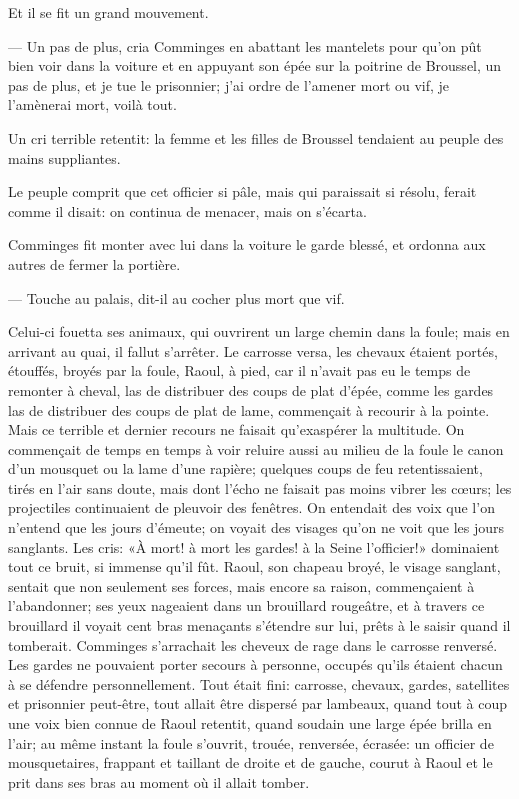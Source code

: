 Et il se fit un grand mouvement.

— Un pas de plus, cria Comminges en abattant les mantelets pour qu'on pût bien voir dans la voiture et en appuyant son épée sur la poitrine de Broussel, un pas de plus, et je tue le prisonnier; j'ai ordre de l'amener mort ou vif, je l'amènerai mort, voilà tout.

Un cri terrible retentit: la femme et les filles de Broussel tendaient au peuple des mains suppliantes.

Le peuple comprit que cet officier si pâle, mais qui paraissait si résolu, ferait comme il disait: on continua de menacer, mais on s'écarta.

Comminges fit monter avec lui dans la voiture le garde blessé, et ordonna aux autres de fermer la portière.

— Touche au palais, dit-il au cocher plus mort que vif.

Celui-ci fouetta ses animaux, qui ouvrirent un large chemin dans la foule; mais en arrivant au quai, il fallut s'arrêter. Le carrosse versa, les chevaux étaient portés, étouffés, broyés par la foule, Raoul, à pied, car il n'avait pas eu le temps de remonter à cheval, las de distribuer des coups de plat d'épée, comme les gardes las de distribuer des coups de plat de lame, commençait à recourir à la pointe. Mais ce terrible et dernier recours ne faisait qu'exaspérer la multitude. On commençait de temps en temps à voir reluire aussi au milieu de la foule le canon d'un mousquet ou la lame d'une rapière; quelques coups de feu retentissaient, tirés en l'air sans doute, mais dont l'écho ne faisait pas moins vibrer les cœurs; les projectiles continuaient de pleuvoir des fenêtres. On entendait des voix que l'on n'entend que les jours d'émeute; on voyait des visages qu'on ne voit que les jours sanglants. Les cris: «À mort! à mort les gardes! à la Seine l'officier!» dominaient tout ce bruit, si immense qu'il fût. Raoul, son chapeau broyé, le visage sanglant, sentait que non seulement ses forces, mais encore sa raison, commençaient à l'abandonner; ses yeux nageaient dans un brouillard rougeâtre, et à travers ce brouillard il voyait cent bras menaçants s'étendre sur lui, prêts à le saisir quand il tomberait. Comminges s'arrachait les cheveux de rage dans le carrosse renversé. Les gardes ne pouvaient porter secours à personne, occupés qu'ils étaient chacun à se défendre personnellement. Tout était fini: carrosse, chevaux, gardes, satellites et prisonnier peut-être, tout allait être dispersé par lambeaux, quand tout à coup une voix bien connue de Raoul retentit, quand soudain une large épée brilla en l'air; au même instant la foule s'ouvrit, trouée, renversée, écrasée: un officier de mousquetaires, frappant et taillant de droite et de gauche, courut à Raoul et le prit dans ses bras au moment où il allait tomber.

